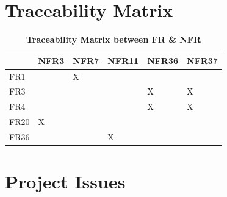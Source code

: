 \documentclass[12pt, titlepage]{article}
\begin{document}
	\section{Traceability Matrix}
	
	\begin{table}[H]
		\caption{\textbf{Traceability Matrix between FR \& NFR}}
		\begin{tabular}{l|l|l|l|l|l|}
			\cline{2-6}
			& NFR3  & NFR7 & NFR11 & NFR36 & NFR37 \\ \hline
			\multicolumn{1}{|l|}{FR1}  &  & X &  &  &  \\ \hline
			\multicolumn{1}{|l|}{FR3}  &  &  &  & X & X \\ \hline
			\multicolumn{1}{|l|}{FR4}  &  &  &  & X & X \\ \hline
			\multicolumn{1}{|l|}{FR20}  & X &  &  &  &  \\ \hline
			\multicolumn{1}{|l|}{FR36}  &  &  & X &  &  \\ \hline
		\end{tabular}
	\end{table}
	
	
	\section{Project Issues}
	
\end{document}
